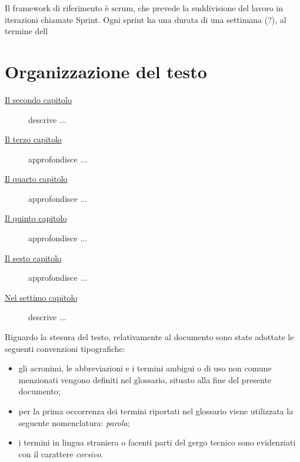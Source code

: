 Il \gls{framework} di riferimento è \gls{scrum}, che prevede la suddivisione del
lavoro in iterazioni chiamate \gls{Sprint}. Ogni sprint ha una durata di una
settimana (?), al termine dell

\section{Organizzazione del testo}

\begin{description}
    \item[{\hyperref[cap:processi-metodologie]{Il secondo capitolo}}] descrive ...

    \item[{\hyperref[cap:descrizione-stage]{Il terzo capitolo}}] approfondisce ...

    \item[{\hyperref[cap:analisi-requisiti]{Il quarto capitolo}}] approfondisce ...

    \item[{\hyperref[cap:progettazione-codifica]{Il quinto capitolo}}] approfondisce ...

    \item[{\hyperref[cap:verifica-validazione]{Il sesto capitolo}}] approfondisce ...

    \item[{\hyperref[cap:conclusioni]{Nel settimo capitolo}}] descrive ...
\end{description}

Riguardo la stesura del testo, relativamente al documento sono state adottate le seguenti convenzioni tipografiche:
\begin{itemize}
    \item gli acronimi, le abbreviazioni e i termini ambigui o di uso non comune menzionati vengono definiti nel glossario, situato alla fine del presente documento;
    \item per la prima occorrenza dei termini riportati nel glossario viene utilizzata la seguente nomenclatura: \emph{parola}\glsfirstoccur;
    \item i termini in lingua straniera o facenti parti del gergo tecnico sono evidenziati con il carattere \emph{corsivo}.
\end{itemize}

